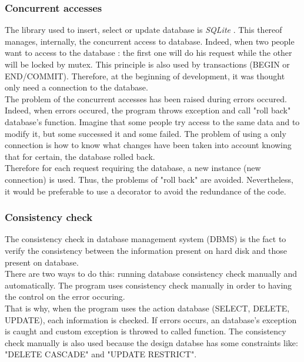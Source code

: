 \subsubsection{Concurrent accesses}
\setlength{\parindent}{1cm}
\hspace{1cm}
The library used to insert, select or update database is
\emph{SQLite} \cite{SQLite}. This thereof manages, internally,
the concurrent access to database. Indeed, when two people want to
access to the database : the first one will do his request while
the other will be locked by mutex. This principle is also used by transactions
(BEGIN or END/COMMIT).
Therefore, at the beginning of development, it was thought only need a
connection to the database.\\
The problem of the concurrent accesses has been raised during errors occured.
Indeed, when errors occured, the program throws exception and call "roll back"
database's function. Imagine that some people try access to the same data and to
modify it, but some successed it and some failed. The problem of using a only
connection is how to know what changes have been taken into account knowing
that for certain, the database rolled back.\\
Therefore for each request requiring the database,
a new instance (new connection) is used. Thus, the problems
of "roll back" are avoided. Nevertheless, it would be preferable to use a decorator
to avoid the redundance of the code.

\subsubsection{Consistency check}

The consistency check in database management system (DBMS) is the fact
to verify the consistency between the information present on hard disk and
those present on database.\\
There are two ways to do this: running database consistency check manually and
automatically. The program uses consistency check manually in order to
having the control on the error occuring.\\
That is why, when the program uses the action database (SELECT, DELETE, UPDATE),
each information is checked. If errors occurs, an database's exception is caught
and custom exception is throwed to called function.
The consistency check manually is also used because the design databse
has some constraints like: "DELETE CASCADE" and "UPDATE RESTRICT".

